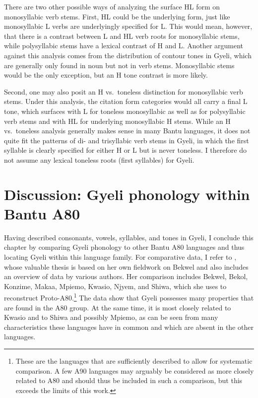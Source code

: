 There are two other possible ways of analyzing the surface HL form on monosyllabic verb stems. First, HL  could be the underlying form, just like monosyllabic L verbs are underlyingly specified for L. This would mean, however, that there is a contrast between L and HL verb roots for monosyllabic stems, while polysyllabic stems have a lexical contrast of H and L. Another argument against this analysis comes from the distribution of contour tones in Gyeli, which are generally only found in noun but not in verb stems. Monosyllabic stems would be the only exception, but an H tone contrast is more likely.

Second, one may also posit an H vs.\ toneless distinction for monosyllabic verb stems. Under this analysis, the citation form categories would all carry a final L tone, which surfaces with L for toneless monosyllabic as well as for polysyllabic verb stems and with HL for underlying monosyllabic H stems. While an H vs.\ toneless analysis generally makes sense in many Bantu languages, it does not quite fit the patterns of di- and trisyllabic verb stems in Gyeli, in which the first syllable is clearly specified for either H or L but is never toneless. I therefore do not assume any lexical toneless roots (first syllables) for Gyeli.




\section[Discussion: Bantu A80 phonology]{Discussion: Gyeli phonology within Bantu A80}
\label{sec:PhonA80}

Having described consonants, vowels, syllables, and tones in Gyeli, I conclude this chapter by comparing Gyeli phonology to other Bantu A80 languages and thus locating Gyeli within this language family. For comparative data, I refer to \citet{cheucle2014}, whose valuable thesis is based on her own fieldwork on Bekwel and also includes an overview of data by various authors. Her comparison includes Bekwel, Bekol, Konzime, Makaa, Mpiemo, Kwasio, Njyem, and Shiwa, which she uses to reconstruct Proto-A80.\footnote{These are the languages that are sufficiently described to allow for  systematic comparison. A few A90 languages may arguably be considered as more closely related to A80 and should thus be included in such a comparison, but this exceeds the limits of this work.} The data show that Gyeli possesses many properties that are found in the A80 group. At the same time, it is most closely related to Kwasio and to Shiwa and possibly Mpiemo, as can be seen from many characteristics these languages have in common and which are absent in the other languages.

